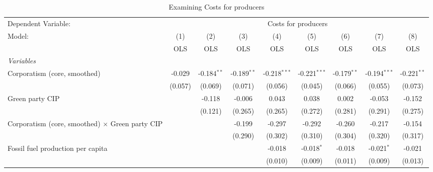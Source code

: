 
\begin{table}[htbp]
   \caption{Examining Costs for producers}
   \centering
   \begin{tabular}{lcccccccc}
      \toprule
      Dependent Variable: & \multicolumn{8}{c}{Costs for producers}\\
      Model:                                                 & (1)     & (2)           & (3)           & (4)            & (5)            & (6)           & (7)            & (8)\\  
                                                             &  OLS    & OLS           & OLS           & OLS            & OLS            & OLS           & OLS            & OLS\\  
      \midrule
      \emph{Variables}\\
      Corporatism (core, smoothed)                           & -0.029  & -0.184$^{**}$ & -0.189$^{**}$ & -0.218$^{***}$ & -0.221$^{***}$ & -0.179$^{**}$ & -0.194$^{***}$ & -0.221$^{**}$\\   
                                                             & (0.057) & (0.069)       & (0.071)       & (0.056)        & (0.045)        & (0.066)       & (0.055)        & (0.073)\\   
      Green party CIP                                        &         & -0.118        & -0.006        & 0.043          & 0.038          & 0.002         & -0.053         & -0.152\\   
                                                             &         & (0.121)       & (0.265)       & (0.265)        & (0.272)        & (0.281)       & (0.291)        & (0.275)\\   
      Corporatism (core, smoothed) $\times$ Green party CIP  &         &               & -0.199        & -0.297         & -0.292         & -0.260        & -0.217         & -0.154\\   
                                                             &         &               & (0.290)       & (0.302)        & (0.310)        & (0.304)       & (0.320)        & (0.317)\\   
      Fossil fuel production per capita                      &         &               &               & -0.018         & -0.018$^{*}$   & -0.018        & -0.021$^{*}$   & -0.021\\   
                                                             &         &               &               & (0.010)        & (0.009)        & (0.011)       & (0.009)        & (0.013)\\   

\end{tabular}
\end{table}
